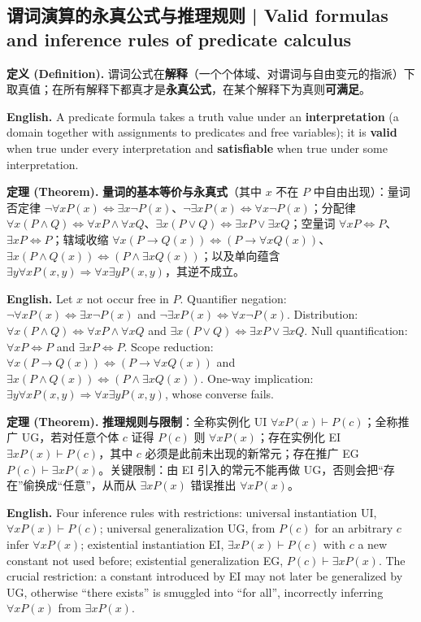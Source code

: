 \documentclass[UTF8,11pt,a4paper]{ctexart}
\newcommand{\EN}[1]{\par\noindent \textbf{English.} #1\par}
\newcommand{\DEF}[2]{\par\noindent\textbf{定义 (Definition).} #1\par\EN{#2}}
\newcommand{\THM}[2]{\par\noindent\textbf{定理 (Theorem).} #1\par\EN{#2}}
\begin{document}
\subsection{谓词演算的永真公式与推理规则 | Valid formulas and inference rules of predicate calculus}
\DEF{谓词公式在\textbf{解释}（一个个体域、对谓词与自由变元的指派）下取真值；在所有解释下都真才是\textbf{永真公式}，在某个解释下为真则\textbf{可满足}。}{A predicate formula takes a truth value under an \textbf{interpretation} (a domain together with assignments to predicates and free variables); it is \textbf{valid} when true under every interpretation and \textbf{satisfiable} when true under some interpretation.}
\THM{\textbf{量词的基本等价与永真式}（其中 $x$ 不在 $P$ 中自由出现）：量词否定律 $\neg\forall xP(x)\Leftrightarrow\exists x\neg P(x)$、$\neg\exists xP(x)\Leftrightarrow\forall x\neg P(x)$；分配律 $\forall x(P\wedge Q)\Leftrightarrow\forall xP\wedge\forall xQ$、$\exists x(P\vee Q)\Leftrightarrow\exists xP\vee\exists xQ$；空量词 $\forall xP\Leftrightarrow P$、$\exists xP\Leftrightarrow P$；辖域收缩 $\forall x(P\to Q(x))\Leftrightarrow(P\to\forall xQ(x))$、$\exists x(P\wedge Q(x))\Leftrightarrow(P\wedge\exists xQ(x))$；以及单向蕴含 $\exists y\forall xP(x,y)\Rightarrow\forall x\exists yP(x,y)$，其逆不成立。}{Let $x$ not occur free in $P$. Quantifier negation: $\neg\forall xP(x)\Leftrightarrow\exists x\neg P(x)$ and $\neg\exists xP(x)\Leftrightarrow\forall x\neg P(x)$. Distribution: $\forall x(P\wedge Q)\Leftrightarrow\forall xP\wedge\forall xQ$ and $\exists x(P\vee Q)\Leftrightarrow\exists xP\vee\exists xQ$. Null quantification: $\forall xP\Leftrightarrow P$ and $\exists xP\Leftrightarrow P$. Scope reduction: $\forall x(P\to Q(x))\Leftrightarrow(P\to\forall xQ(x))$ and $\exists x(P\wedge Q(x))\Leftrightarrow(P\wedge\exists xQ(x))$. One-way implication: $\exists y\forall xP(x,y)\Rightarrow\forall x\exists yP(x,y)$, whose converse fails.}
\THM{\textbf{推理规则与限制}：全称实例化 UI $\forall xP(x)\vdash P(c)$；全称推广 UG，若对任意个体 $c$ 证得 $P(c)$ 则 $\forall xP(x)$；存在实例化 EI $\exists xP(x)\vdash P(c)$，其中 $c$ 必须是此前未出现的新常元；存在推广 EG $P(c)\vdash\exists xP(x)$。关键限制：由 EI 引入的常元不能再做 UG，否则会把“存在”偷换成“任意”，从而从 $\exists xP(x)$ 错误推出 $\forall xP(x)$。}{Four inference rules with restrictions: universal instantiation UI, $\forall xP(x)\vdash P(c)$; universal generalization UG, from $P(c)$ for an arbitrary $c$ infer $\forall xP(x)$; existential instantiation EI, $\exists xP(x)\vdash P(c)$ with $c$ a new constant not used before; existential generalization EG, $P(c)\vdash\exists xP(x)$. The crucial restriction: a constant introduced by EI may not later be generalized by UG, otherwise ``there exists'' is smuggled into ``for all'', incorrectly inferring $\forall xP(x)$ from $\exists xP(x)$.}
\end{document}
